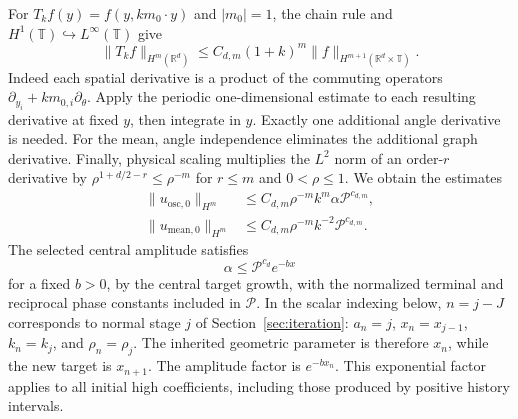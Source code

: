 \documentclass[11pt]{article}
\newcommand{\R}{\mathbb R}
\theoremstyle{definition}
\begin{document}
For $T_kf(y)=f(y,km_0\cdot y)$ and $|m_0|=1$, the chain rule and
$H^1(\mathbb T)\hookrightarrow L^\infty(\mathbb T)$ give
\[
 \|T_kf\|_{H^m(\R^d)}
       \le C_{d,m}(1+k)^m
                    \|f\|_{H^{m+1}(\R^d\times\mathbb T)}.
\]
Indeed each spatial derivative is a product of the commuting operators
$\partial_{y_i}+km_{0,i}\partial_\theta$. Apply the periodic one-dimensional
estimate to each resulting derivative at fixed $y$, then integrate in $y$.
Exactly one additional angle derivative is needed. For the mean, angle
independence eliminates the additional graph derivative.
Finally, physical scaling multiplies the $L^2$ norm of an order-$r$
derivative by $\rho^{1+d/2-r}\le\rho^{-m}$ for $r\le m$ and
$0<\rho\le1$. We obtain the estimates
\begin{align}
 \|u_{\mathrm{osc},0}\|_{H^m}
 &\le C_{d,m}\rho^{-m}k^m\alpha \mathcal P^{c_{d,m}},\label{eq:joined-initial-high}\\
 \|u_{\mathrm{mean},0}\|_{H^m}
 &\le C_{d,m}\rho^{-m}k^{-2}\mathcal P^{c_{d,m}}.
 \label{eq:joined-initial-mean}
\end{align}
The selected central amplitude satisfies
\[
 \alpha\le \mathcal P^{c_d}e^{-b x}
\]
for a fixed $b>0$, by the central target growth, with
the normalized terminal and reciprocal phase constants included in $\mathcal P$.
In the scalar indexing below, $n=j-J$ corresponds to normal stage $j$
of Section~\ref{sec:iteration}: $a_n=j$, $x_n=x_{j-1}$,
$k_n=k_j$, and $\rho_n=\rho_j$. The inherited geometric parameter
is therefore $x_n$, while the new target is $x_{n+1}$. The amplitude
factor is $e^{-b x_n}$. This exponential factor applies to
all initial high coefficients, including those produced by positive
history intervals.
\end{document}

